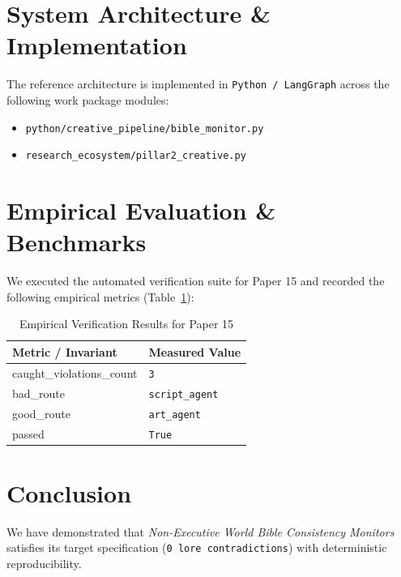 \documentclass[10pt,twocolumn]{article}
\begin{document}
\section{System Architecture \& Implementation}
The reference architecture is implemented in \texttt{Python / LangGraph} across the following work package modules:
\begin{itemize}
  \item \texttt{python/creative\_pipeline/bible\_monitor.py}
  \item \texttt{research\_ecosystem/pillar2\_creative.py}
\end{itemize}

\section{Empirical Evaluation \& Benchmarks}
We executed the automated verification suite for Paper 15 and recorded the following empirical metrics (Table~\ref{tab:metrics}):

\begin{table}[htbp]
\centering
\caption{Empirical Verification Results for Paper 15}
\label{tab:metrics}
\begin{tabular}{ll}
\toprule
\textbf{Metric / Invariant} & \textbf{Measured Value} \\
\midrule
    caught\_violations\_count & \texttt{3} \\
    bad\_route & \texttt{script\_agent} \\
    good\_route & \texttt{art\_agent} \\
    passed & \texttt{True} \\
\bottomrule
\end{tabular}
\end{table}

\section{Conclusion}
We have demonstrated that \textit{Non-Executive World Bible Consistency Monitors} satisfies its target specification (\texttt{0 lore contradictions}) with deterministic reproducibility.



\end{document}
